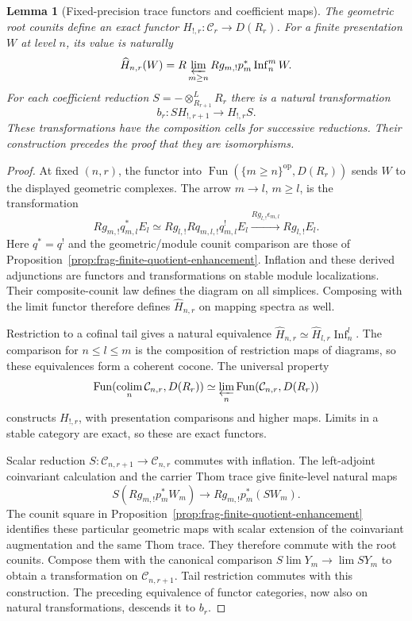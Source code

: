 \documentclass[11pt]{article}
\newtheorem{lemma}[theorem]{Lemma}
\theoremstyle{definition}
\theoremstyle{remark}
\begin{document}
\begin{lemma}[Fixed-precision trace functors and coefficient maps]
\label{lem:frag-presenting-system-assembly}
The geometric root counits define an exact functor
$H_{!,r}:\mathcal C_r\to D(R_r)$.  For a finite presentation $W$
at level $n$, its value is naturally
\[
 \widehat H_{n,r}(W)=R\varprojlim_{m\ge n}
          Rg_{m,!}p_m^*\operatorname{Inf}_n^mW.
\]
For each coefficient reduction $S=-\otimes^L_{R_{r+1}}R_r$ there
is a natural transformation
\[
 b_r:S H_{!,r+1}\longrightarrow H_{!,r}S.
\]
These transformations have the composition cells for successive
reductions.  Their construction precedes the proof that they are
isomorphisms.
\end{lemma}
\begin{proof}
At fixed $(n,r)$, the functor into
$\operatorname{Fun}(\{m\ge n\}^{\mathrm{op}},D(R_r))$ sends $W$
to the displayed geometric complexes.  The arrow $m\to l$, $m\ge l$,
is the transformation
\[
 Rg_{m,!}q_{m,l}^*E_l
 \simeq Rg_{l,!}Rq_{m,l,!}q_{m,l}^!E_l
 \xrightarrow{Rg_{l,!}\epsilon_{m,l}}Rg_{l,!}E_l.
\]
Here $q^*=q^!$ and the geometric/module counit comparison are
those of Proposition~\ref{prop:frag-finite-quotient-enhancement}.
Inflation and these derived adjunctions are functors and transformations
on stable module localizations.  Their composite-counit law defines
the diagram on all simplices.  Composing with the limit functor
therefore defines $\widehat H_{n,r}$ on mapping spectra as well.

Restriction to a cofinal tail gives a natural equivalence
$\widehat H_{n,r}\simeq\widehat H_{l,r}\operatorname{Inf}_n^l$.
The comparison for $n\le l\le m$ is the composition of restriction
maps of diagrams, so these equivalences form a coherent cocone.
The universal property
\[
 \operatorname{Fun}(\operatorname*{colim}_n\mathcal C_{n,r},D(R_r))
 \simeq\varprojlim_n\operatorname{Fun}(\mathcal C_{n,r},D(R_r))
\]
constructs $H_{!,r}$, with presentation comparisons and higher maps.
Limits in a stable category are exact, so these are exact functors.

Scalar reduction $S:\mathcal C_{n,r+1}\to\mathcal C_{n,r}$ commutes
with inflation.  The left-adjoint coinvariant calculation and the
carrier Thom trace give finite-level natural maps
\[
 S(Rg_{m,!}p_m^*W_m)\longrightarrow Rg_{m,!}p_m^*(SW_m).
\]
The counit square in Proposition~\ref{prop:frag-finite-quotient-enhancement}
identifies these particular geometric maps with scalar extension of
the coinvariant augmentation and the same Thom trace.  They therefore
commute with the root counits.  Compose them with the canonical comparison
$S\lim Y_m\to\lim SY_m$ to obtain a transformation on
$\mathcal C_{n,r+1}$.  Tail restriction commutes with this
construction.  The preceding equivalence of functor categories,
now also on natural transformations, descends it to $b_r$.


\end{proof}
\end{document}
